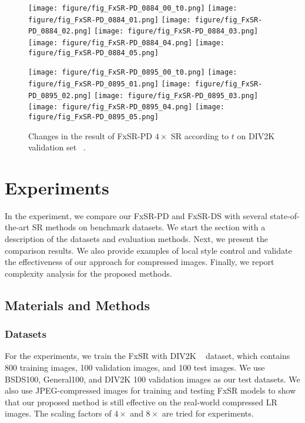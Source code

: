 \documentclass{article}
\begin{document}
\begin{figure*}[!t]
\begin{minipage}[t]{1.0\linewidth}
    \texttt{[image: figure/fig\_FxSR-PD\_0884\_00\_t0.png]}\hfill
    \texttt{[image: figure/fig\_FxSR-PD\_0884\_01.png]}\hfill
    \texttt{[image: figure/fig\_FxSR-PD\_0884\_02.png]}\hfill
    \texttt{[image: figure/fig\_FxSR-PD\_0884\_03.png]}\hfill
    \texttt{[image: figure/fig\_FxSR-PD\_0884\_04.png]}\hfill
    \texttt{[image: figure/fig\_FxSR-PD\_0884\_05.png]}\vfill
    \vspace{0.3cm}
    
    \texttt{[image: figure/fig\_FxSR-PD\_0895\_00\_t0.png]}\hfill
    \texttt{[image: figure/fig\_FxSR-PD\_0895\_01.png]}\hfill
    \texttt{[image: figure/fig\_FxSR-PD\_0895\_02.png]}\hfill
    \texttt{[image: figure/fig\_FxSR-PD\_0895\_03.png]}\hfill
    \texttt{[image: figure/fig\_FxSR-PD\_0895\_04.png]}\hfill
    \texttt{[image: figure/fig\_FxSR-PD\_0895\_05.png]}\vfill
    
\end{minipage}
\caption{Changes in the result of FxSR-PD $4\times$ SR according to $t$ on DIV2K validation set~\cite{agustsson2017ntire} .}
\label{fig:fig_FxSR-PD_t}
\end{figure*}

\section{Experiments}
In the experiment, we compare our FxSR-PD and FxSR-DS with several state-of-the-art SR methods on benchmark datasets. We start the section with a description of the datasets and evaluation methods. Next, we present the comparison results. We also provide examples of local style control and validate the effectiveness of our approach for compressed images. Finally, we report complexity analysis for the proposed methods.


\subsection{Materials and Methods} 

\subsubsection{Datasets}
For the experiments, we train the FxSR with DIV2K ~\cite{agustsson2017ntire} dataset, which contains 800 training images, 100 validation images, and 100 test images. We use BSDS100, General100, and DIV2K 100 validation images as our test datasets. We also use JPEG-compressed images for training and testing FxSR models to show that our proposed method is still effective on the real-world compressed LR images. The scaling factors of ${4}\times$ and ${8}\times$ are tried for experiments.
\end{document}
